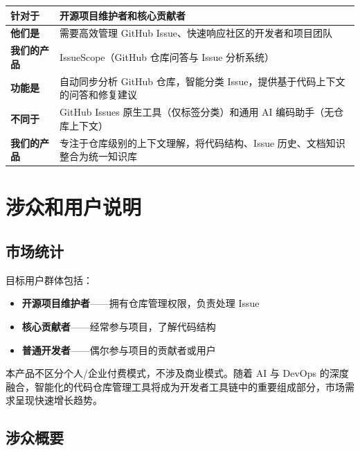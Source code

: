 \documentclass[10pt,a4paper]{article}
\newenvironment{ieeetable}{\begin{center}}{\end{center}}
\begin{document}
\begin{ieeetable}
    \begin{tabularx}{\textwidth}{L{3cm} X}
        \toprule
        \textbf{针对于} & 开源项目维护者和核心贡献者 \\
        \midrule
        \textbf{他们是} & 需要高效管理 GitHub Issue、快速响应社区的开发者和项目团队 \\
        \midrule
        \textbf{我们的产品} & IssueScope（GitHub 仓库问答与 Issue 分析系统） \\
        \midrule
        \textbf{功能是} & 自动同步分析 GitHub 仓库，智能分类 Issue，提供基于代码上下文的问答和修复建议 \\
        \midrule
        \textbf{不同于} & GitHub Issues 原生工具（仅标签分类）和通用 AI 编码助手（无仓库上下文） \\
        \midrule
        \textbf{我们的产品} & 专注于仓库级别的上下文理解，将代码结构、Issue 历史、文档知识整合为统一知识库 \\
        \bottomrule
    \end{tabularx}
\end{ieeetable}

\section{涉众和用户说明}

\subsection{市场统计}

目标用户群体包括：
\begin{itemize}
    \item \textbf{开源项目维护者}——拥有仓库管理权限，负责处理 Issue
    \item \textbf{核心贡献者}——经常参与项目，了解代码结构
    \item \textbf{普通开发者}——偶尔参与项目的贡献者或用户
\end{itemize}

本产品不区分个人/企业付费模式，不涉及商业模式。随着 AI 与 DevOps 的深度融合，智能化的代码仓库管理工具将成为开发者工具链中的重要组成部分，市场需求呈现快速增长趋势。

\subsection{涉众概要}
\end{document}
